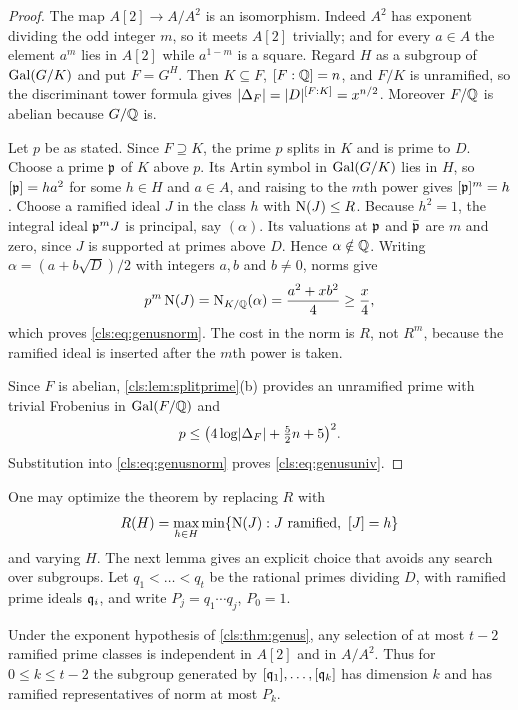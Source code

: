 \begin{proof}
The map $A[2]\to A/A^2$ is an isomorphism. Indeed $A^2$ has exponent dividing the odd
integer $m$, so it meets $A[2]$ trivially; and for every $a\in A$ the element $a^m$ lies
in $A[2]$ while $a^{1-m}$ is a square. Regard $H$ as a subgroup of $\operatorname{Gal}(G/K)$ and put
$F=G^H$. Then $K\subseteq F$, $[F:\mathbb{Q}]=n$, and $F/K$ is unramified, so the discriminant
tower formula gives $\lvert\Delta_F\rvert=\lvert D\rvert^{[F:K]}=x^{n/2}$. Moreover $F/\mathbb{Q}$ is abelian
because $G/\mathbb{Q}$ is.

Let $p$ be as stated. Since $F\supseteq K$, the prime $p$ splits in $K$ and is prime to
$D$. Choose a prime $\mathfrak p$ of $K$ above $p$. Its Artin symbol in $\operatorname{Gal}(G/K)$ lies in $H$,
so $[\mathfrak p]=ha^2$ for some $h\in H$ and $a\in A$, and raising to the $m$th power gives
$[\mathfrak p]^m=h$. Choose a ramified ideal $J$ in the class $h$ with $\operatorname{N}(J)\le R$. Because
$h^2=1$, the integral ideal $\mathfrak p^mJ$ is principal, say $(\alpha)$. Its valuations at
$\mathfrak p$ and $\bar{\mathfrak p}$ are $m$ and zero, since $J$ is supported at primes above $D$.
Hence $\alpha\notin\mathbb{Q}$. Writing $\alpha=(a+b\sqrt D)/2$ with integers $a,b$ and $b\ne0$,
norms give
\[
 p^m\operatorname{N}(J)=\operatorname{N}_{K/\mathbb{Q}}(\alpha)=\frac{a^2+xb^2}{4}\ge\frac x4 ,
\]
which proves \eqref{cls:eq:genusnorm}. The cost in the norm is $R$, not $R^m$, because the
ramified ideal is inserted after the $m$th power is taken.

Since $F$ is abelian, \cref{cls:lem:splitprime}(b) provides an unramified prime with
trivial Frobenius in $\operatorname{Gal}(F/\mathbb{Q})$ and
\[
 p\le\bigl(4\log\lvert\Delta_F\rvert+\tfrac52n+5\bigr)^2 .
\]
Substitution into \eqref{cls:eq:genusnorm} proves \eqref{cls:eq:genusuniv}.
\end{proof}

One may optimize the theorem by replacing $R$ with
\[
 R(H)=\max_{h\in H}\min\{\operatorname{N}(J):J\text{ ramified},\ [J]=h\}
\]
and varying $H$. The next
lemma gives an explicit choice that avoids any search over subgroups. Let
$q_1<\dots<q_t$ be the rational primes dividing $D$, with ramified prime ideals
$\mathfrak q_i$, and write $P_j=q_1\cdots q_j$, $P_0=1$.

\begin{lemma}\label{cls:lem:ramified}
Under the exponent hypothesis of \cref{cls:thm:genus}, any selection of at most $t-2$
ramified prime classes is independent in $A[2]$ and in $A/A^2$. Thus for $0\le k\le t-2$
the subgroup generated by $[\mathfrak q_1],\dots,[\mathfrak q_k]$ has dimension $k$ and has ramified
representatives of norm at most $P_k$.
\end{lemma}

